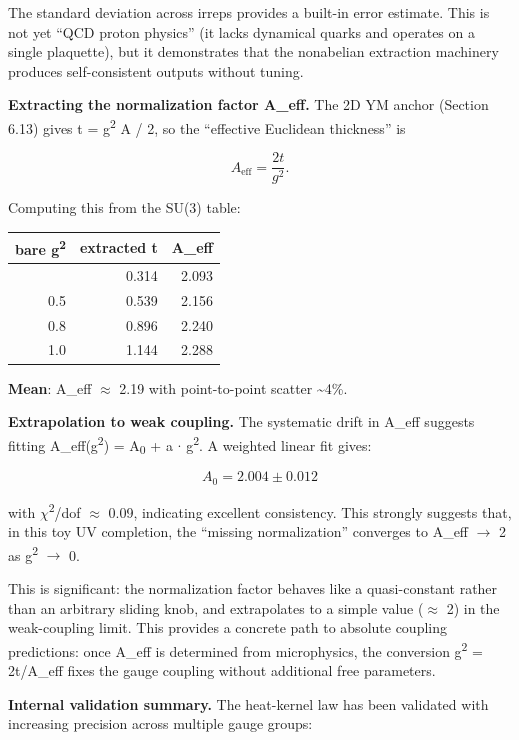 \documentclass[11pt,a4paper]{article}
\theoremstyle{remark}
\begin{document}
The standard deviation across irreps provides a built-in error estimate. This is
not yet ``QCD proton physics'' (it lacks dynamical quarks and operates on a single
plaquette), but it demonstrates that the nonabelian extraction machinery produces
self-consistent outputs without tuning.

\textbf{Extracting the normalization factor A\_eff.} The 2D YM anchor
(Section 6.13) gives t = g\textsuperscript{2} A / 2, so the ``effective Euclidean thickness'' is

\[
A_\mathrm{eff} = \frac{2t}{g^2}.
\]

Computing this from the SU(3) table:

{\def\LTcaptype{none} %
\begin{longtable}[]{@{}rrr@{}}
\toprule\noalign{}
bare g\textsuperscript{2} & extracted t & A\_eff \\
\midrule\noalign{}
\endhead
\bottomrule\noalign{}
\endlastfoot
0.3 & 0.314 & 2.093 \\
0.5 & 0.539 & 2.156 \\
0.8 & 0.896 & 2.240 \\
1.0 & 1.144 & 2.288 \\
\end{longtable}
}

\textbf{Mean}: A\_eff \ensuremath{\approx} 2.19 with point-to-point scatter \textasciitilde4\%.

\textbf{Extrapolation to weak coupling.} The systematic drift in A\_eff
suggests fitting A\_eff(g\textsuperscript{2}) = A\textsubscript{0} + a \ensuremath{\cdot} g\textsuperscript{2}. A weighted linear
fit gives:

\[
A_0 = 2.004 \pm 0.012
\]

with \ensuremath{\chi}\textsuperscript{2}/dof \ensuremath{\approx} 0.09, indicating excellent consistency. This
strongly suggests that, in this toy UV completion, the ``missing normalization''
converges to A\_eff \ensuremath{\to} 2 as g\textsuperscript{2} \ensuremath{\to} 0.

This is significant: the normalization factor behaves like a quasi-constant
rather than an arbitrary sliding knob, and extrapolates to a simple value
(\ensuremath{\approx} 2) in the weak-coupling limit. This provides a concrete path to
absolute coupling predictions: once A\_eff is determined from
microphysics, the conversion g\textsuperscript{2} = 2t/A\_eff fixes the gauge
coupling without additional free parameters.

\textbf{Internal validation summary.} The heat-kernel law has been validated with
increasing precision across multiple gauge groups:
\end{document}
